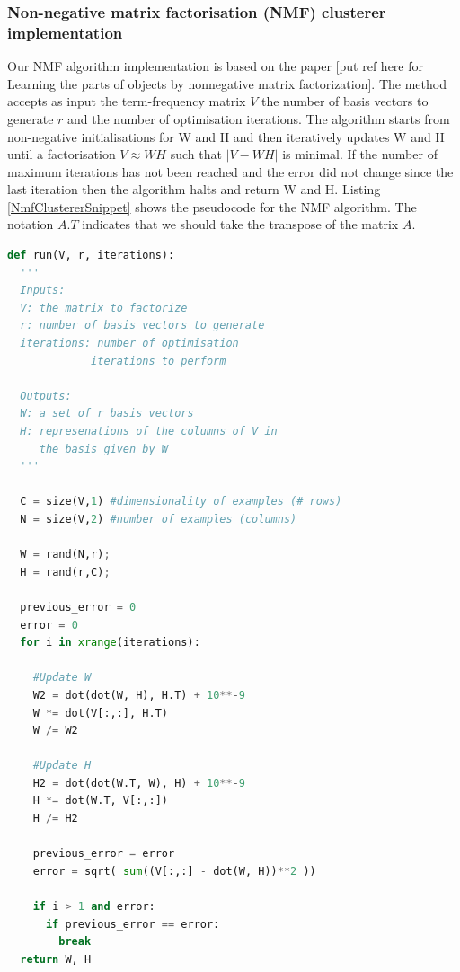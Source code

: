 \subsubsection{Non-negative matrix factorisation (NMF) clusterer implementation} Our NMF algorithm implementation is based on the paper [put ref here for Learning the parts of objects by nonnegative matrix factorization]. The method accepts as input the term-frequency matrix $V$ the number of basis vectors to generate $r$ and the number of optimisation iterations. The algorithm starts from non-negative initialisations for W and H and then iteratively updates W and H until a factorisation $V \approx WH$ such that $| V - WH |$ is minimal. If the number of maximum iterations has not been reached and the error did not change since the last iteration then the algorithm halts and return W and H. Listing \ref{NmfClustererSnippet} shows the pseudocode for the NMF algorithm. The notation $A.T$ indicates that we should take the transpose of the matrix $A$.
  
\begin{lstlisting}[language=Python, label=NmfClustererSnippet, caption=Pseudocode for the NMF algorithm]
def run(V, r, iterations):
  '''
  Inputs: 
  V: the matrix to factorize
  r: number of basis vectors to generate
  iterations: number of optimisation
             iterations to perform
  
  Outputs:
  W: a set of r basis vectors
  H: represenations of the columns of V in 
     the basis given by W
  '''
  
  C = size(V,1) #dimensionality of examples (# rows)
  N = size(V,2) #number of examples (columns)

  W = rand(N,r);
  H = rand(r,C);
  
  previous_error = 0
  error = 0
  for i in xrange(iterations):

    #Update W
    W2 = dot(dot(W, H), H.T) + 10**-9
    W *= dot(V[:,:], H.T)
    W /= W2
    
    #Update H
    H2 = dot(dot(W.T, W), H) + 10**-9
    H *= dot(W.T, V[:,:])
    H /= H2                                     
    
    previous_error = error
    error = sqrt( sum((V[:,:] - dot(W, H))**2 ))
    
    if i > 1 and error:
      if previous_error == error:
        break
  return W, H
  
\end{lstlisting}

